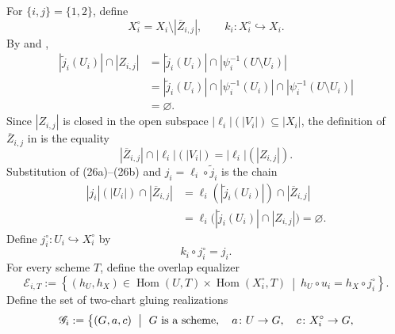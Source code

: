 \begin{definition}
  \label{def:nagata-two-open-intermediate-schemes}
  \lean{}

  For $\{i,j\}=\{1,2\}$, define
  \[
    X_i^\circ=X_i\setminus|\overline Z_{i,j}|,\qquad
    k_i\colon X_i^\circ\hookrightarrow X_i.
  \]
  By  and
  ,
  \[
  \begin{aligned}
    |\widetilde j_i(U_i)|\cap|Z_{i,j}|
      &=|\widetilde j_i(U_i)|
          \cap|\psi_i^{-1}(U\setminus U_i)|\\
      &=|\widetilde j_i(U_i)|
          \cap|\psi_i^{-1}(U_i)|
          \cap|\psi_i^{-1}(U\setminus U_i)|\\
      &=\varnothing.
  \end{aligned}                                                   \tag{26a}
  \]
  Since $|Z_{i,j}|$ is closed in the open subspace
  $|\ell_i|(|V_i|)\subseteq|X_i|$, the definition of
  $\overline Z_{i,j}$ in
   is the equality
  \[
    |\overline Z_{i,j}|\cap|\ell_i|(|V_i|)
      =|\ell_i|(|Z_{i,j}|).                                      \tag{26b}
  \]
  Substitution of (26a)--(26b) and
  $j_i=\ell_i\circ\widetilde j_i$ is the chain
  \[
  \begin{aligned}
    |j_i|(|U_i|)\cap|\overline Z_{i,j}|
      &=\ell_i(|\widetilde j_i(U_i)|)
          \cap|\overline Z_{i,j}|\\
      &=\ell_i\bigl(
          |\widetilde j_i(U_i)|\cap|Z_{i,j}|
        \bigr)
       =\varnothing.
  \end{aligned}                                                   \tag{26c}
  \]
  Define $j_i^\circ\colon U_i\hookrightarrow X_i^\circ$ by
  \[
    k_i\circ j_i^\circ=j_i.
  \]
  For every scheme $T$, define the overlap equalizer
  \[
    \mathscr E_{i,T}:=
      \left\{(h_U,h_X)\in
        \operatorname{Hom}(U,T)\times\operatorname{Hom}(X_i^\circ,T)
        \ \middle|\ 
        h_U\circ u_i=h_X\circ j_i^\circ
      \right\}.                                                    \tag{26d}
  \]
  Define the set of two-chart gluing realizations
  \[
  \begin{aligned}
    \mathscr G_i:=\bigl\{(G,a,c)\ \bigm|\ {}&
      G\text{ is a scheme},\quad
      a\colon U\to G,\quad c\colon X_i^\circ\to G,\\

\end{aligned}\]
\end{definition}
